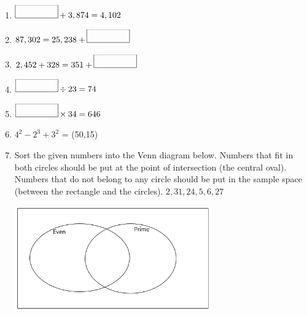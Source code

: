 \documentclass{article}
\begin{document}
\begin{enumerate}
\\

\item \quad \( \framebox(50,15){} + 3,874 = 4,102 \) \vspace{5pt} \\

\item \quad \( 87,302 = 25,238 + \framebox(50,15){} \) \vspace{5pt} \\

\item \quad \( 2,452 + 328 = 351 + \framebox(50,15){} \) \vspace{5pt} \\

\item \quad \( \framebox(50,15){} \div 23 = 74  \) \vspace{5pt} \\

\item \quad \( \framebox(50,15){} \times 34 = 646  \) \vspace{5pt} \\

\item \quad \( 4^{2} - 2^{3} + 3^{2}  \) = \framebox(50,15){} \vspace{5pt} \\

\item \quad Sort the given numbers into the Venn diagram below. Numbers that fit in both circles should be put at the point of intersection (the central oval). Numbers that do not belong to any circle should be put in the sample space (between the rectangle and the circles).\hspace{1cm} \( { 2, 31, 24, 5, 6, 27} \)

\begin{center}
\includegraphics[width=8.5cm]{Year_6_Mixed_Tests/Homework_Tasks/Venn_Even_Prime_21_11_23_.png}
\end{center}



\end{enumerate}
\end{document}
